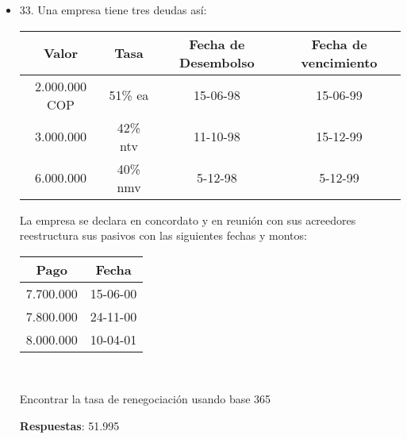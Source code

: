 \begin{itemize}
 \item 33. Una empresa tiene tres deudas así:
 \begin{center}
    \begin{tabular}{| c | c | c | c |}\hline
    Valor & Tasa & Fecha de Desembolso & Fecha de vencimiento \\ \hline
    2.000.000 COP & 51\% ea  & 15-06-98 & 15-06-99 \\ \hline
    3.000.000 & 42\% ntv &11-10-98 &15-12-99\\ \hline
    6.000.000 & 40\% nmv &5-12-98 &5-12-99\\ \hline
    \end{tabular}
 \end{center}
 
    \textbf{}La empresa se declara en concordato y en reunión con sus acreedores reestructura sus pasivos con las siguientes fechas y montos:\\
 \begin{center}
     \begin{tabular}{| c | c |}
    \hline
    Pago & Fecha  \\ \hline
    7.700.000 &15-06-00  \\ \hline
    7.800.000 & 24-11-00 \\ \hline
    8.000.000 & 10-04-01 \\ \hline
    \end{tabular}\\
 \end{center}
    \textbf{}Encontrar la tasa de renegociación usando base 365
    
    \textbf{Respuestas}: 51.995%

\end{itemize}